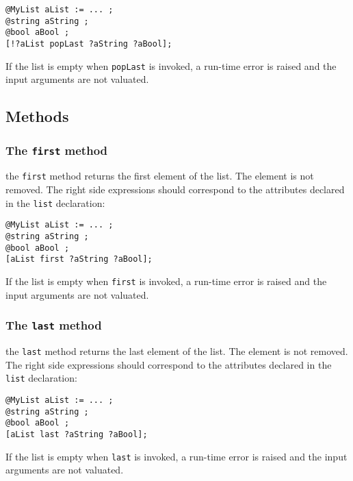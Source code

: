 \begin{lstlisting}[language=galgas]
@MyList aList := ... ;
@string aString ;
@bool aBool ;
[!?aList popLast ?aString ?aBool];
\end{lstlisting}

If the list is empty when \lstinline[language=galgas]!popLast! is invoked, a run-time error is raised and the input arguments are not valuated.

\subsection{Methods}

\subsubsection{The \lstinline[language=galgas]!first! method}

the \lstinline[language=galgas]!first! method returns the first element of the list. The element is not removed. The right side expressions should correspond to the attributes declared in the \lstinline[language=galgas]!list! declaration:

\begin{lstlisting}[language=galgas]
@MyList aList := ... ;
@string aString ;
@bool aBool ;
[aList first ?aString ?aBool];
\end{lstlisting}

If the list is empty when \lstinline[language=galgas]!first! is invoked, a run-time error is raised and the input arguments are not valuated.

\subsubsection{The \lstinline[language=galgas]!last! method}

the \lstinline[language=galgas]!last! method returns the last element of the list. The element is not removed. The right side expressions should correspond to the attributes declared in the \lstinline[language=galgas]!list! declaration:\\

\begin{lstlisting}[language=galgas]
@MyList aList := ... ;
@string aString ;
@bool aBool ;
[aList last ?aString ?aBool];
\end{lstlisting}


If the list is empty when \lstinline[language=galgas]!last! is invoked, a run-time error is raised and the input arguments are not valuated.








